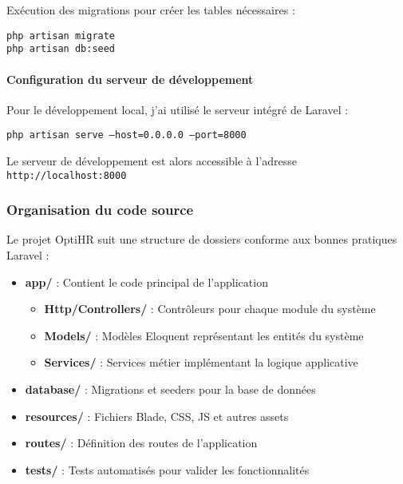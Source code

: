 Exécution des migrations pour créer les tables nécessaires :

\begin{tcolorbox}[colback=black, coltext=white, title=Exécution des migrations, fonttitle=\bfseries]
\texttt{php artisan migrate} \\
\texttt{php artisan db:seed}
\end{tcolorbox}

\paragraph{Configuration du serveur de développement}
Pour le développement local, j'ai utilisé le serveur intégré de Laravel :

\begin{tcolorbox}[colback=black, coltext=white, title=Lancement du serveur de développement, fonttitle=\bfseries]
\texttt{php artisan serve --host=0.0.0.0 --port=8000}
\end{tcolorbox}

Le serveur de développement est alors accessible à l'adresse \texttt{http://localhost:8000}

\subsubsection{Organisation du code source}
Le projet OptiHR suit une structure de dossiers conforme aux bonnes pratiques Laravel :

\begin{itemize}
    \item \textbf{app/} : Contient le code principal de l'application
    \begin{itemize}
        \item \textbf{Http/Controllers/} : Contrôleurs pour chaque module du système
        \item \textbf{Models/} : Modèles Eloquent représentant les entités du système
        \item \textbf{Services/} : Services métier implémentant la logique applicative
    \end{itemize}
    \item \textbf{database/} : Migrations et seeders pour la base de données
    \item \textbf{resources/} : Fichiers Blade, CSS, JS et autres assets
    \item \textbf{routes/} : Définition des routes de l'application
    \item \textbf{tests/} : Tests automatisés pour valider les fonctionnalités
\end{itemize}

